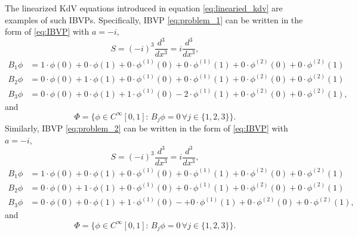 \documentclass[12pt, oneside, a4paper]{article}
\begin{document}
The linearized KdV equations introduced in equation \eqref{eq:linearied_kdv} are examples of such IBVPs. Specifically, IBVP \eqref{eq:problem_1} can be written in the form of \eqref{eq:IBVP} with $a=-i$,
\[S = (-i)^3 \frac{d^3}{dx^3} = i\frac{d^3}{dx^3},\]
\begin{align*}
    B_1 \phi &= 1\cdot\phi(0) + 0\cdot\phi(1) + 0\cdot\phi^{(1)}(0) + 0\cdot\phi^{(1)}(1) + 0\cdot\phi^{(2)}(0) + 0\cdot\phi^{(2)}(1)\\
    B_2 \phi &= 0\cdot\phi(0) + 1\cdot\phi(1) + 0\cdot\phi^{(1)}(0) + 0\cdot\phi^{(1)}(1) + 0\cdot\phi^{(2)}(0) + 0\cdot\phi^{(2)}(1)\\
    B_3 \phi &= 0\cdot\phi(0) + 0\cdot\phi(1) + 1\cdot\phi^{(1)}(0) - 2\cdot\phi^{(1)}(1) + 0\cdot\phi^{(2)}(0) + 0\cdot\phi^{(2)}(1),
\end{align*}
and 
\[\Phi = \{\phi\in C^{\infty}[0,1]:\, B_j\phi = 0\,\forall j\in\{1,2,3\}\}.\]
Similarly, IBVP \eqref{eq:problem_2} can be written in the form of \eqref{eq:IBVP} with $a=-i$,
\[S = (-i)^3 \frac{d^3}{dx^3} = i\frac{d^3}{dx^3},\]
\begin{align*}
    B_1 \phi &= 1\cdot\phi(0) + 0\cdot\phi(1) + 0\cdot\phi^{(1)}(0) + 0\cdot\phi^{(1)}(1) + 0\cdot\phi^{(2)}(0) + 0\cdot\phi^{(2)}(1)\\
    B_2 \phi &= 0\cdot\phi(0) + 1\cdot\phi(1) + 0\cdot\phi^{(1)}(0) + 0\cdot\phi^{(1)}(1) + 0\cdot\phi^{(2)}(0) + 0\cdot\phi^{(2)}(1)\\
    B_3 \phi &= 0\cdot\phi(0) + 0\cdot\phi(1) + 1\cdot\phi^{(1)}(0) -+ 0\cdot\phi^{(1)}(1) + 0\cdot\phi^{(2)}(0) + 0\cdot\phi^{(2)}(1),
\end{align*}
and 
\[\Phi = \{\phi\in C^{\infty}[0,1]:\, B_j\phi = 0\,\forall j\in\{1,2,3\}\}.\]

\end{document}
